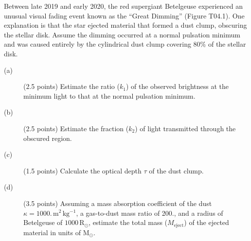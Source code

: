 Between late 2019 and early 2020, the red supergiant Betelgeuse experienced an
unusual visual fading event known as the ``Great Dimming'' (Figure T04.1). One
explanation is that the star ejected material that formed a dust clump,
obscuring the stellar disk. Assume the dimming occurred at a normal pulsation
minimum and was caused entirely by the cylindrical dust clump covering 80\% of
the stellar disk.


\begin{description}
\item[(a)] (2.5 points) Estimate the ratio ($k_1$) of the observed brightness
  at the minimum light to that at the normal pulsation minimum.
\item[(b)] (2.5 points) Estimate the fraction ($k_2$) of light transmitted
  through the obscured region.
\item[(c)] (1.5 points) Calculate the optical depth $\tau$ of the dust clump.
\item[(d)] (3.5 points) Assuming a mass absorption coefficient of the dust
  $\kappa = 1000.\,\mathrm{m^2\,kg^{-1}}$, a gas-to-dust mass ratio of 200.,
  and a radius of Betelgeuse of $1000\,\mathrm{R}_\odot$, estimate the total
  mass ($M_{\mathrm{eject}}$) of the ejected material in units of
  $\mathrm{M}_\odot$.
\end{description}
